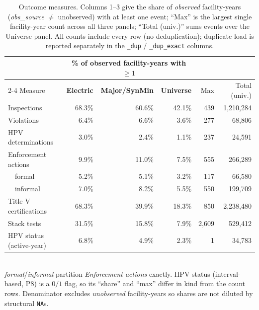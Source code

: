 \begin{table}[htbp]
\centering
\small
\caption{Outcome measures. Columns 1--3 give the share of \emph{observed} facility-years (\emph{obs\_source} $\neq$ unobserved) with at least one event; ``Max'' is the largest single facility-year count across all three panels; ``Total (univ.)'' sums events over the Universe panel. All counts include every row (no deduplication); duplicate load is reported separately in the \texttt{\_dup} / \texttt{\_dup\_exact} columns.}
\label{tab:measures}
\begin{tabular}{l rrr rr}
\toprule
  & \multicolumn{3}{c}{\% of observed facility-years with $\geq 1$} &   \\
\cmidrule(lr){2-4}
Measure & \textbf{Electric} & \textbf{Major/SynMin} & \textbf{Universe} & Max & Total (univ.) \\
\midrule
Inspections & 68.3\% & 60.6\% & 42.1\% & 439 & 1,210,284 \\
Violations & 6.4\% & 6.6\% & 3.6\% & 277 & 68,806 \\
HPV determinations & 3.0\% & 2.4\% & 1.1\% & 237 & 24,591 \\
Enforcement actions & 9.9\% & 11.0\% & 7.5\% & 555 & 266,289 \\
\ \ formal & 5.2\% & 5.1\% & 3.2\% & 117 & 66,580 \\
\ \ informal & 7.0\% & 8.2\% & 5.5\% & 550 & 199,709 \\
Title V certifications & 68.3\% & 39.9\% & 18.3\% & 850 & 2,238,480 \\
Stack tests & 31.5\% & 15.8\% & 7.9\% & 2,609 & 529,412 \\
HPV status (active-year) & 6.8\% & 4.9\% & 2.3\% & 1 & 34,783 \\
\bottomrule
\end{tabular}
\\[2pt]
{\footnotesize \emph{formal}/\emph{informal} partition \emph{Enforcement actions} exactly. HPV status (interval-based, P8) is a $0/1$ flag, so its ``share'' and ``max'' differ in kind from the count rows. Denominator excludes \emph{unobserved} facility-years so shares are not diluted by structural \texttt{NA}s.}
\end{table}

